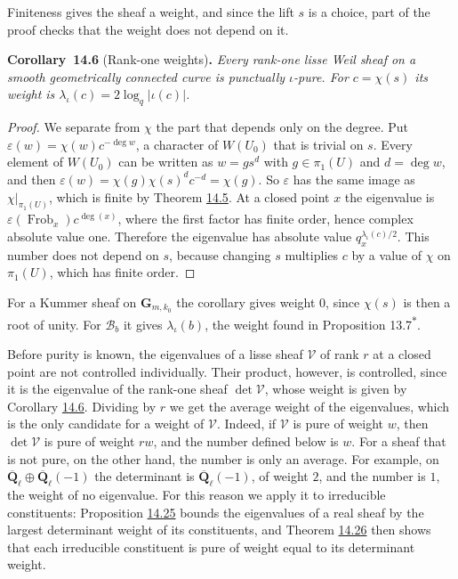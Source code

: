 \documentclass[11pt]{article}
\newenvironment{bpstatement}[2]{\par\addvspace{0.6\baselineskip}\noindent\textbf{#1}#2\textbf{.}\enspace\ignorespaces}
  {\par\addvspace{0.4\baselineskip}}
\newenvironment{bpstatementit}[2]{\begin{bpstatement}{#1}{#2}\itshape\ignorespaces}{\end{bpstatement}}
\newcommand{\bpout}[1]{#1\textsuperscript{\hyperlink{bp-outside}{\ensuremath{\ast}}}}
\begin{document}
\label{bp22}%
Finiteness gives the sheaf a weight, and since the lift \(s\) is a choice, part of the proof checks that the weight does not depend on it.

\label{bp23}%
\begin{bpstatementit}{Corollary~14.6}{ (Rank-one weights)}
Every rank-one lisse Weil sheaf on a smooth geometrically connected curve is punctually \(\iota\)-pure.  For \(c=\chi(s)\) its weight is \(\lambda_\iota(c)=2\log_q|\iota(c)|\).
\end{bpstatementit}

\begin{proof}[{Proof}]\label{bp24}%
We separate from \(\chi\) the part that depends only on the degree. Put \(\varepsilon(w)=\chi(w)c^{-\deg w}\), a character of \(W(U_0)\) that is trivial on \(s\).  Every element of \(W(U_0)\) can be written as \(w=gs^d\) with \(g\in\pi_1(U)\) and \(d=\deg w\), and then \(\varepsilon(w)=\chi(g)\chi(s)^dc^{-d}=\chi(g)\). So \(\varepsilon\) has the same image as \(\chi|_{\pi_1(U)}\), which is finite by Theorem \hyperref[bp20]{14.5}.  At a closed point \(x\) the eigenvalue is \(\varepsilon(\operatorname{Frob}_x)c^{\deg(x)}\), where the first factor has finite order, hence complex absolute value one. Therefore the eigenvalue has absolute value \(q_x^{\lambda_\iota(c)/2}\).  This number does not depend on \(s\), because changing \(s\) multiplies \(c\) by a value of \(\chi\) on \(\pi_1(U)\), which has finite order.
\end{proof}

\label{bp25}%
For a Kummer sheaf on \(\mathbf G_{m,k_0}\) the corollary gives weight \(0\), since \(\chi(s)\) is then a root of unity. For \(\mathcal B_b\) it gives \(\lambda_\iota(b)\), the weight found in Proposition \bpout{13.7}.

Before purity is known, the eigenvalues of a lisse sheaf \(\mathcal V\) of rank \(r\) at a closed point are not controlled individually. Their product, however, is controlled, since it is the eigenvalue of the rank-one sheaf \(\det\mathcal V\), whose weight is given by Corollary \hyperref[bp23]{14.6}. Dividing by \(r\) we get the average weight of the eigenvalues, which is the only candidate for a weight of \(\mathcal V\). Indeed, if \(\mathcal V\) is pure of weight \(w\), then \(\det\mathcal V\) is pure of weight \(rw\), and the number defined below is \(w\). For a sheaf that is not pure, on the other hand, the number is only an average. For example, on \(\overline{\mathbf Q}_\ell\oplus\overline{\mathbf Q}_\ell(-1)\) the determinant is \(\overline{\mathbf Q}_\ell(-1)\), of weight \(2\), and the number is \(1\), the weight of no eigenvalue. For this reason we apply it to irreducible constituents: Proposition \hyperref[bp78]{14.25} bounds the eigenvalues of a real sheaf by the largest determinant weight of its constituents, and Theorem \hyperref[bp82]{14.26} then shows that each irreducible constituent is pure of weight equal to its determinant weight.
\end{document}
